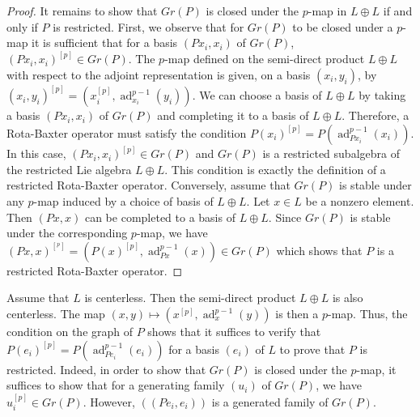 \documentclass[11pt, twoside]{article}
\DeclareMathOperator{\ad}{ad}
\begin{document}
\begin{proof}
    It remains to show that $Gr(P) $ is closed under the $p$-map in $L\oplus L $ if and only if $P$ is restricted. First, we observe that for $Gr(P) $ to be closed under a $p$-map it is sufficient that for a basis $(Px_i,x_i) $ of $Gr(P)$, $(Px_i,x_i)^{[p]}\in Gr(P) $. The $p$-map defined on the semi-direct product $L\oplus L$ with respect to the adjoint representation is given, on a basis $(x_i,y_i) $, by $(x_i,y_i)^{[p]}=(x_i^{[p]},\ad_{x_i}^{p-1}(y_i)) $. We can choose a basis of $L\oplus L$ by taking a basis $(Px_i,x_i) $ of $Gr(P)$ and completing it to a basis of $L\oplus L$. Therefore, a Rota-Baxter operator must satisfy the condition $P(x_i)^{[p]}=P(\ad_{Px_i}^{p-1}(x_i)) $. In this case, $(Px_i,x_i)^{[p]}\in Gr(P)$ and $Gr(P) $ is a restricted subalgebra of the restricted Lie algebra $L\oplus L$. This condition is exactly the definition of a restricted Rota-Baxter operator. Conversely, assume that $Gr(P) $ is stable under any $p$-map induced by a choice of basis of $L\oplus L$. Let $x\in L$ be a nonzero element. Then $(Px,x) $ can be completed to a basis of $L\oplus L $. Since $Gr(P)$ is stable under the corresponding $p$-map, we have $(Px,x)^{[^p]}=(P(x)^{[p]},\ad_{Px}^{p-1}(x))\in Gr(P) $ which shows that $P $ is a restricted Rota-Baxter operator.
\end{proof}

\begin{rmq} Assume that $L $ is centerless. Then the semi-direct product $L\oplus L $ is also centerless. The map $(x,y)\mapsto (x^{[p]},\ad_x^{p-1}(y)) $ is then a $p$-map. 
    Thus, the condition on the graph of $P$ shows that it suffices to verify that $P(e_i)^{[p]}=P(\ad_{Pe_i}^{p-1}(e_i)) $ for a basis $(e_i)$ of $L$ to prove that $P$ is restricted. Indeed, in order to show that $Gr(P) $ is closed under the $p$-map, it suffices to show that for a generating family $(u_i)$ of $Gr(P)$, we have $u_i^{[p]}\in Gr(P) $. However, $((Pe_i,e_i)) $ is a generated family of $Gr(P) $.
\end{rmq}
\end{document}
